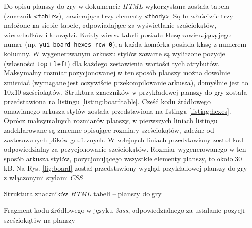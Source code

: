 \documentclass[11pt,twoside]{report}
\providecommand{\imref}[1]{Rys. \ref{#1}} %
\begin{document}
Do opisu planszy do gry w dokumencie \emph{HTML} wykorzystana została
tabela (znacznik \texttt{<table>}), zawierająca trzy elementy
\texttt{<tbody>}. Są to właściwie trzy nałożone na siebie tabele,
odpowiadające za wyświetlanie sześciokątów, wierzchołków i
krawędzi. Każdy wiersz tabeli posiada klasę zawierającą jego numer
(np. \texttt{yui-board-hexes-row-0}), a każda komórka posiada klasę z
numerem kolumny. W wygenerowanym arkuszu stylów zawarte są wyliczone
pozycje (własności \texttt{top} i \texttt{left}) dla każdego
zestawienia wartości tych atrybutów. Maksymalny rozmiar pozycjonowanej
w ten sposób planszy można dowolnie zmieniać (wymagane jest oczywiście
przekompilowanie arkusza), domyślnie jest to 10x10
sześciokątów. Struktura znaczników w przykładowej planszy do gry
została przedstawiona na listingu \ref{listing:boardtable}. Część kodu
źródłowego omawianego arkusza stylów została przedstawiona na listingu
\ref{listing:hexes}. Oprócz maksymalnych rozmiarów planszy, w
pierwszych liniach listingu zadeklarowane są zmienne opisujące
rozmiary sześciokątów, zależne od zastosowanych plików graficznych. W
kolejnych liniach przedstawiony został kod odpowiedzialny za
pozycjonowanie sześciokątów. Rozmiar wygenerowanego w ten sposób
arkusza stylów, pozycjonującego wszystkie elementy planszy, to około
30 kB. Na \imref{fig:board} został przedstawiony wygląd przykładowej
planszy do gry z włączonymi stylami \emph{CSS}

\begin{listing}
  
  \caption{Struktura znaczników \emph{HTML} tabeli -- planszy do gry}
  \label{listing:boardtable}
\end{listing}

\begin{listing}
  
  \caption{Fragment kodu źródłowego w języku \emph{Sass},
    odpowiedzialnego za ustalanie pozycji sześciokątów na planszy}
  \label{listing:hexes}
\end{listing}
\end{document}
